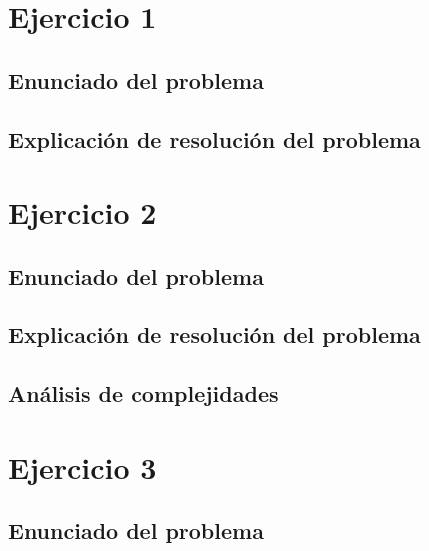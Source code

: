 \documentclass[12pt, a4paper]{article}
\begin{document}
\maketitle
\tableofcontents
\newpage

\newpage
\section{Ejercicio 1} 
\subsection{Enunciado del problema}

\subsection{Explicaci\'on de resoluci\'on del problema}


\newpage
\section{Ejercicio 2} 
\subsection{Enunciado del problema}

\subsection{Explicaci\'on de resoluci\'on del problema}

\subsection{An\'alisis de complejidades}

%


\newpage
\section{Ejercicio 3} 
\subsection{Enunciado del problema}

\end{document}
